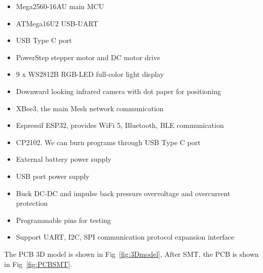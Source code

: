 \documentclass[sigconf]{acmart}
\begin{document}
\begin{itemize}
  \item Mega2560-16AU main MCU
  \item ATMega16U2 USB-UART
  \item USB Type C port
  \item PowerStep stepper motor and DC motor drive
  \item 9 x WS2812B RGB-LED full-color light display
  \item Downward looking infrared camera with dot paper for positioning
  \item XBee3, the main Mesh network communication
  \item Espressif ESP32, provides WiFi 5, Bluetooth, BLE communication
  \item CP2102. We can burn programs through USB Type C port
  \item External battery power supply
  \item USB port power supply
  \item Buck DC-DC and impulse back pressure overvoltage and overcurrent protection
  \item Programmable pins for testing
  \item Support UART, I2C, SPI communication protocol expansion interface
\end{itemize}

The PCB 3D model is shown in Fig~\ref{fig:3Dmodel}, After SMT, the PCB is shown in Fig~\ref{fig:PCBSMT}.



\end{document}
